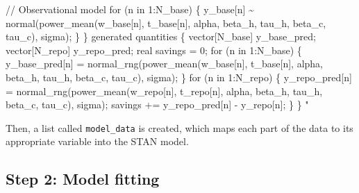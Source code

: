 \documentclass[
]{article}
\newenvironment{Shaded}{\begin{snugshade}}{\end{snugshade}}
\newcommand{\AttributeTok}[1]{\textcolor[rgb]{0.77,0.63,0.00}{#1}}
\newcommand{\FunctionTok}[1]{\textcolor[rgb]{0.00,0.00,0.00}{#1}}
\newcommand{\NormalTok}[1]{#1}
\newcommand{\OtherTok}[1]{\textcolor[rgb]{0.56,0.35,0.01}{#1}}
\newcommand{\SpecialCharTok}[1]{\textcolor[rgb]{0.00,0.00,0.00}{#1}}
\newcommand{\StringTok}[1]{\textcolor[rgb]{0.31,0.60,0.02}{#1}}
\begin{document}
\begin{Shaded}
\begin{Highlighting}[]
\StringTok{  // Observational model}
\StringTok{  for (n in 1:N\_base) \{}
\StringTok{    y\_base[n] \textasciitilde{} normal(power\_mean(w\_base[n], t\_base[n], alpha, beta\_h, tau\_h, beta\_c, tau\_c), sigma);}
\StringTok{  \}}
\StringTok{\}}
\StringTok{generated quantities \{}
\StringTok{  vector[N\_base] y\_base\_pred;}
\StringTok{  vector[N\_repo] y\_repo\_pred;}
\StringTok{  real savings = 0;}
\StringTok{  }
\StringTok{  for (n in 1:N\_base) \{}
\StringTok{    y\_base\_pred[n] = normal\_rng(power\_mean(w\_base[n], t\_base[n], alpha, beta\_h, tau\_h, beta\_c, tau\_c), sigma);}
\StringTok{  \}}
\StringTok{  }
\StringTok{  for (n in 1:N\_repo) \{}
\StringTok{    y\_repo\_pred[n] = normal\_rng(power\_mean(w\_repo[n], t\_repo[n], alpha, beta\_h, tau\_h, beta\_c, tau\_c), sigma);}
\StringTok{    savings += y\_repo\_pred[n] {-} y\_repo[n];}
\StringTok{  \}}
\StringTok{\}}
\StringTok{"}
\end{Highlighting}
\end{Shaded}

Then, a list called \texttt{model\_data} is created, which maps each part of the data to its appropriate variable into the STAN model.

\begin{Shaded}
\end{Shaded}

\hypertarget{step-2-model-fitting}{%
\subsection{Step 2: Model fitting}\label{step-2-model-fitting}}
\end{document}
